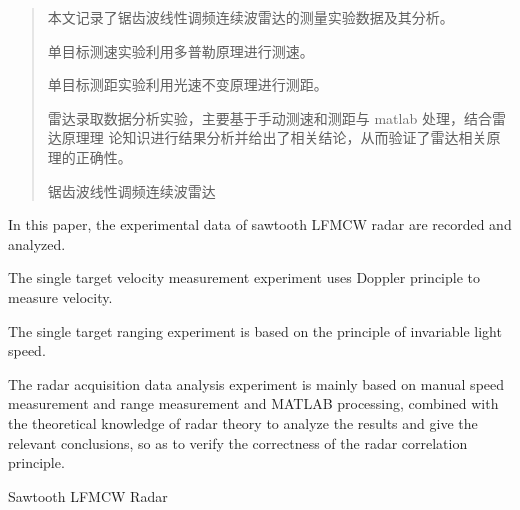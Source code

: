 \documentclass[../main]{subfiles}
\begin{document}
\begin{abstract}
  本文记录了锯齿波线性调频连续波雷达的测量实验数据及其分析。

  单目标测速实验利用多普勒原理进行测速。

  单目标测距实验利用光速不变原理进行测距。

  雷达录取数据分析实验，主要基于手动测速和测距与 matlab 处理，结合雷达原理理
  论知识进行结果分析并给出了相关结论，从而验证了雷达相关原理的正确性。

  \begin{keyword}
    锯齿波线性调频连续波雷达
  \end{keyword}
\end{abstract}

\begin{abstract*}
  In this paper, the experimental data of sawtooth LFMCW radar are recorded
  and analyzed.

  The single target velocity measurement experiment uses Doppler principle to
  measure velocity.

  The single target ranging experiment is based on the principle of
  invariable light speed.

  The radar acquisition data analysis experiment is mainly based on manual
  speed measurement and range measurement and MATLAB processing, combined
  with the theoretical knowledge of radar theory to analyze the results and
  give the relevant conclusions, so as to verify the correctness of the radar
  correlation principle.

  \begin{keyword*}
    Sawtooth LFMCW Radar
  \end{keyword*}
\end{abstract*}
\end{document}
